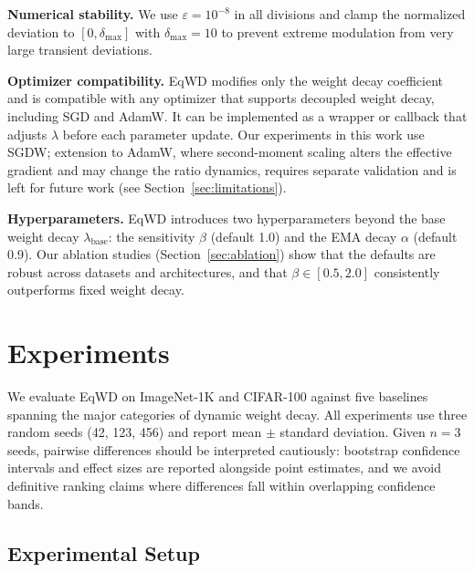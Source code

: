 \documentclass{article}
\begin{document}
\textbf{Numerical stability.} We use $\varepsilon = 10^{-8}$ in all
divisions and clamp the normalized deviation to
$[0, \delta_{\text{max}}]$ with $\delta_{\text{max}} = 10$ to
prevent extreme modulation from very large transient deviations.

\textbf{Optimizer compatibility.} EqWD modifies only the weight decay
coefficient and is compatible with any optimizer that supports decoupled
weight decay, including SGD and AdamW. It can be implemented as a
wrapper or callback that adjusts $\lambda$ before each parameter
update. Our experiments in this work use SGDW; extension to AdamW, where
second-moment scaling alters the effective gradient and may change the
ratio dynamics, requires separate validation and is left for future work
(see Section~\ref{sec:limitations}).

\textbf{Hyperparameters.} EqWD introduces two hyperparameters beyond the
base weight decay $\lambda_{\text{base}}$: the sensitivity $\beta$
(default 1.0) and the EMA decay $\alpha$ (default 0.9). Our ablation
studies (Section~\ref{sec:ablation}) show that the defaults are robust across datasets
and architectures, and that $\beta \in [0.5, 2.0]$ consistently
outperforms fixed weight decay.


\section{Experiments}
\label{sec:experiments}

We evaluate EqWD on ImageNet-1K \citep{deng2009imagenet} and CIFAR-100
\citep{krizhevsky2009cifar} against five baselines spanning the major
categories of dynamic weight decay. All experiments use three random
seeds (42, 123, 456) and report mean $\pm$ standard deviation. Given
$n=3$ seeds, pairwise differences should be interpreted cautiously:
bootstrap confidence intervals and effect sizes are reported alongside
point estimates, and we avoid definitive ranking claims where
differences fall within overlapping confidence bands.

\subsection{Experimental Setup}
\label{sec:setup}
\end{document}
